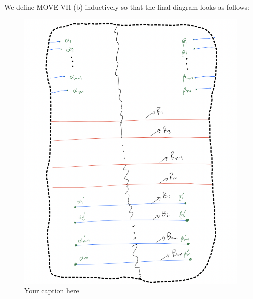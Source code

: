 We define MOVE \RN{7}-(b) inductively so that the final diagram looks as follows:
\begin{figure}[H] %
    \centering
    \includegraphics[width=\linewidth]{diagrams/definition7/6.png} %
    \caption{Your caption here}
    \label{fig:your-label}
\end{figure}

